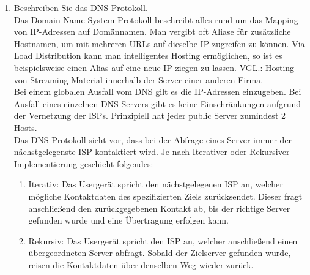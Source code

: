 \documentclass[11pt]{article}
\begin{document}
\begin{enumerate}[\thesection .1]
    \item Beschreiben Sie das DNS-Protokoll.\\
        Das Domain Name System-Protokoll beschreibt alles rund um das Mapping von IP-Adressen auf Domännamen.
        Man vergibt oft Aliase für zusätzliche Hostnamen, um mit mehreren URLs auf dieselbe IP zugreifen zu können.
        Via Load Distribution kann man intelligentes Hosting ermöglichen, so ist es beispielsweise einen Alias auf eine neue IP ziegen zu lassen.
        VGL.: Hosting von Streaming-Material innerhalb der Server einer anderen Firma.\\

        Bei einem globalen Ausfall vom DNS gilt es die IP-Adressen einzugeben.
        Bei Ausfall eines einzelnen DNS-Servers gibt es keine Einschränkungen aufgrund der Vernetzung der ISPs.
        Prinzipiell hat jeder public Server zumindest 2 Hosts.\\

        Das DNS-Protokoll sieht vor, dass bei der Abfrage eines Server immer der nächstgelegenste ISP kontaktiert wird.
        Je nach Iterativer oder Rekursiver Implementierung geschieht folgendes:
        \begin{addmargin}[1em]{1em}
            \begin{enumerate}[$\diamond$]
                \item Iterativ: Das Usergerät spricht den nächstgelegenen ISP an, welcher mögliche Kontaktdaten des spezifizierten Ziels zurücksendet.
                Dieser fragt anschließend den zurückgegebenen Kontakt ab, bis der richtige Server gefunden wurde und eine Übertragung erfolgen kann.

                \item Rekursiv: Das Usergerät spricht den ISP an, welcher anschließend einen übergeordneten Server abfragt. Sobald der Zielserver gefunden wurde,
                reisen die Kontaktdaten über denselben Weg wieder zurück.

            \end{enumerate}
        \end{addmargin}
\end{enumerate}
\end{document}
